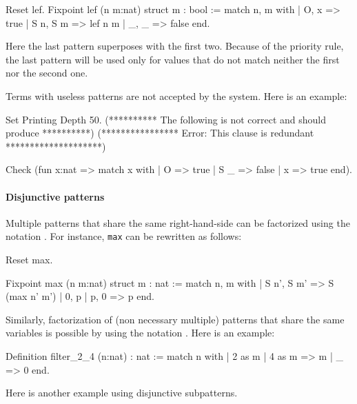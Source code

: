\begin{coq_example}
Reset lef.
Fixpoint lef (n m:nat) {struct m} : bool :=
  match n, m with
  | O, x => true
  | S n, S m => lef n m
  | _, _ => false
  end.
\end{coq_example}

Here the last pattern superposes with the first two. Because
of the priority rule, the last pattern
will be used only for values that do not match neither the  first nor
the second one.

Terms with useless patterns are not accepted by the
system. Here is an example:
\begin{coq_eval}
Set Printing Depth 50.
  (********** The following is not correct and should produce **********)
  (**************** Error: This clause is redundant ********************)
\end{coq_eval}
\begin{coq_example}
Check (fun x:nat =>
         match x with
         | O => true
         | S _ => false
         | x => true
         end).
\end{coq_example}

\paragraph{Disjunctive patterns}

Multiple patterns that share the same right-hand-side can be
factorized using the notation \nelist{\multpattern}{\tt |}. For instance,
{\tt max} can be rewritten as follows:

\begin{coq_eval}
Reset max.
\end{coq_eval}
\begin{coq_example}
Fixpoint max (n m:nat) {struct m} : nat :=
  match n, m with
  | S n', S m' => S (max n' m')
  | 0, p | p, 0 => p
  end.
\end{coq_example}

Similarly, factorization of (non necessary multiple) patterns
that share the same variables is possible by using the notation
\nelist{\pattern}{\tt |}. Here is an example:

\begin{coq_example}
Definition filter_2_4 (n:nat) : nat :=
  match n with
  | 2 as m | 4 as m => m
  | _ => 0
  end.
\end{coq_example}

Here is another example using disjunctive subpatterns.

